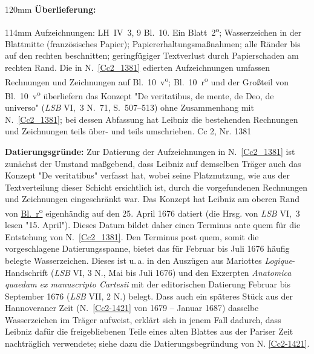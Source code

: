 \begin{ledgroupsized}[r]{120mm}
\footnotesize
\pstart
\noindent\textbf{Überlieferung:}
\pend
\end{ledgroupsized}
\begin{ledgroupsized}[r]{114mm}
\footnotesize
\pstart
\parindent -6mm
%
Aufzeichnungen:
LH~IV~3, 9 Bl.~10.
Ein Blatt~2\textsuperscript{o};
{Wasserzeichen} in der Blattmitte (französisches Papier);
Papiererhaltungsmaßnahmen;
alle Ränder bis auf den rechten beschnitten;
geringfügiger Textverlust durch Papierschaden am rechten Rand.
Die in N.~\ref{Cc2_1381} edierten Aufzeichnungen umfassen Rechnungen und Zeichnungen auf Bl.~10~v\textsuperscript{o};
Bl.~10~r\textsuperscript{o} und der Großteil von Bl.~10~v\textsuperscript{o} überliefern das Konzept \cite{02168}"De veritatibus, de mente, de Deo, de universo" (\textit{LSB} VI,~3 N.~71, S.~507--513) ohne Zusammenhang mit N.~\ref{Cc2_1381}; bei dessen Abfassung hat Leibniz die bestehenden Rechnungen und Zeichnungen teils über- und teils umschrieben.%
\pend
\pstart\noindent
Cc 2, Nr. 1381
\pend
\end{ledgroupsized}
\vspace{5mm}
\begin{ledgroup}
\footnotesize
\pstart
\noindent
\textbf{Datierungsgründe:}
Zur Datierung der Aufzeichnungen in N.~\ref{Cc2_1381} ist zunächst der Umstand maßgebend, dass Leibniz auf demselben Träger auch das \cite{02168}Konzept "De veritatibus" verfasst hat, wobei seine Platznutzung, wie aus der Textverteilung dieser Schicht ersichtlich ist, durch die vorgefundenen Rechnungen und Zeichnungen eingeschränkt war.
Das Konzept hat Leibniz am oberen Rand von 
\href{\Scan{LH_04_03_09b_010r}}%
{Bl.~r\textsuperscript{o}} 
eigenhändig auf den 25. April 1676 datiert (die Hrsg. von \textit{LSB} VI,~3 lesen "15. April").
Dieses Datum bildet daher einen Terminus ante quem für die Entstehung von N.~\ref{Cc2_1381}.
\pend
\pstart
Den Terminus post quem, somit die vorgeschlagene Datierungsspanne, bietet das für Februar bis Juli 1676 häufig belegte Wasserzeichen.
Dieses ist u.\,a. in den
\cite{02169}Auszügen aus 
Mariottes  \textit{Logique}-Handschrift (\textit{LSB} VI, 3 N., Mai bis Juli 1676)
und den Exzerpten \cite{02170}\textit{Anatomica quaedam ex manuscripto Cartesii} mit der editorischen Datierung Februar bis September 1676 (\textit{LSB} VII, 2 N.) belegt.
Dass auch ein späteres Stück aus der Hannoveraner Zeit (N.~\ref{Cc2-1421} von 1679 -- Januar 1687) dasselbe Wasserzeichen im Träger aufweist, erklärt sich in jenem Fall dadurch, dass Leibniz dafür die freigebliebenen Teile eines alten Blattes aus der Pariser Zeit nachträglich verwendete; siehe dazu die Datierungsbegründung von N. \ref{Cc2-1421}.
\pend 
\end{ledgroup}
